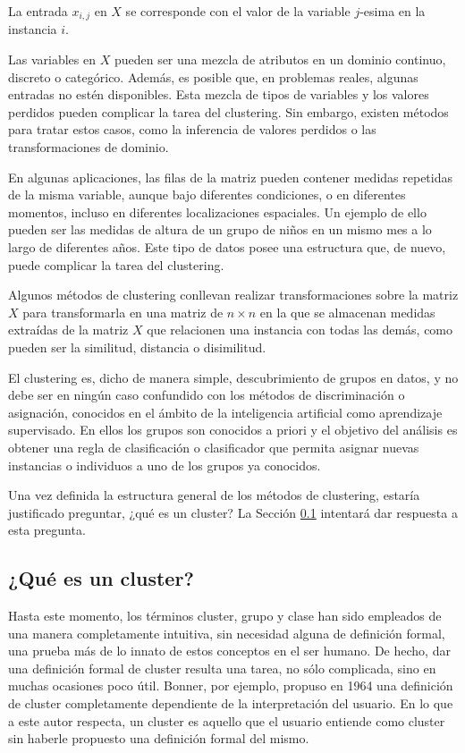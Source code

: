 La entrada $x_{i,j}$ en $X$ se corresponde con el valor de la variable $j$-esima en la instancia $i$.

Las variables en $X$ pueden ser una mezcla de atributos en un dominio continuo, discreto o categórico. Además, es posible que, en problemas reales, algunas entradas no estén disponibles. Esta mezcla de tipos de variables y los valores perdidos pueden complicar la tarea del clustering. Sin embargo, existen métodos para tratar estos casos, como la inferencia de valores perdidos o las transformaciones de dominio.

En algunas aplicaciones, las filas de la matriz pueden contener medidas repetidas de la misma variable, aunque bajo diferentes condiciones, o en diferentes momentos, incluso en diferentes localizaciones espaciales. Un ejemplo de ello pueden ser las medidas de altura de un grupo de niños en un mismo mes a lo largo de diferentes años. Este tipo de datos posee una estructura que, de nuevo, puede complicar la tarea del clustering.

Algunos métodos de clustering conllevan realizar transformaciones sobre la matriz $X$ para transformarla en una matriz de $n \times n$ en la que se almacenan medidas extraídas de la matriz $X$ que relacionen una instancia con todas las demás, como pueden ser la similitud, distancia o disimilitud.

El clustering es, dicho de manera simple, descubrimiento de grupos en datos, y no debe ser en ningún caso confundido con los métodos de discriminación o asignación, conocidos en el ámbito de la inteligencia artificial como aprendizaje supervisado. En ellos los grupos son conocidos a priori y el objetivo del análisis es obtener una regla de clasificación o clasificador que permita asignar nuevas instancias o individuos a uno de los grupos ya conocidos.


Una vez definida la estructura general de los métodos de clustering, estaría justificado preguntar, ¿qué es un cluster? La Sección \ref{QueEsCluster} intentará dar respuesta a esta pregunta.

\subsection{¿Qué es un cluster?} \label{QueEsCluster}

Hasta este momento, los términos cluster, grupo y clase han sido empleados de una manera completamente intuitiva, sin necesidad alguna de definición formal, una prueba más de lo innato de estos conceptos en el ser humano. De hecho, dar una definición formal de cluster resulta una tarea, no sólo complicada, sino en muchas ocasiones poco útil. Bonner, por ejemplo, propuso en 1964 una definición de cluster completamente dependiente de la interpretación del usuario. En lo que a este autor respecta, un cluster es aquello que el usuario entiende como cluster sin haberle propuesto una definición formal del mismo.

